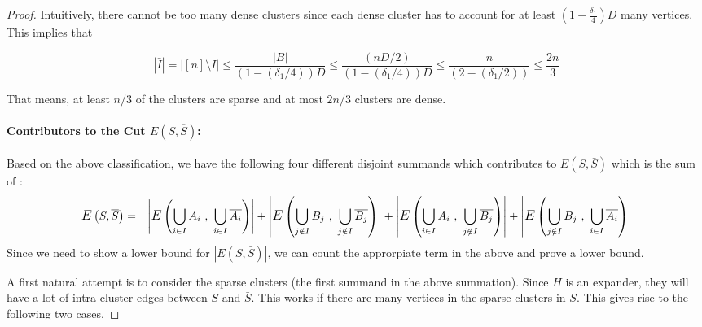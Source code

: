 \begin{proof}
Intuitively, there cannot be too many dense clusters since each dense cluster has to account for at least $\left(1-\frac{\delta_1}{4}\right)D$ many vertices. This implies that 

$$|\bar{I}| = \left|[n]\setminus I\right|\le \frac{|B|}{\left(1-(\delta_1/4)\right)D} \le \frac{(nD/2)}{\left(1-(\delta_1/4)\right)D} \le \frac{n}{\left(2-(\delta_1/2)\right)} \le \frac{2n}{3}$$

\noindent That means, at least $n/3$ of the clusters are sparse and at most $2n/3$ clusters are dense.

\paragraph{Contributors to the Cut $E(S,\overline{S})$:} Based on the above classification, we have the following four different disjoint summands which contributes to $E(S,\bar{S})$ which is the sum of :
\begin{eqnarray*}
\mathlarger{E}\left(S, \bar{S}\right) & = & 
\left| \mathlarger{E}\left(\bigcup_{i \in I} A_i~,~\bigcup_{i \in I} \bar{A_i} \right) \right| + 
\left| \mathlarger{E}\left(\bigcup_{j \notin I} B_j~,~\bigcup_{j \notin I} \bar{B_j} \right) \right|+ 
\left| \mathlarger{E}\left(\bigcup_{i \in I} A_i~,~\bigcup_{j \notin I} \bar{B_j} \right) \right| +
\left| \mathlarger{E}\left(\bigcup_{j \notin I} B_j~,~\bigcup_{i \in I} \bar{A_i} \right) \right|
\label{eqn:edge-sum-split}
\end{eqnarray*}
\noindent Since we need to show a lower bound for $|E(S,\bar{S})|$, we can count the approrpiate term in the above and prove a lower bound.

A first natural attempt is to consider the sparse clusters (the first summand in the above summation). Since $H$ is an expander, they will have a lot of intra-cluster edges between $S$ and $\bar{S}$. This works if there are many vertices in the sparse clusters in $S$. This gives rise to the following two cases.


\end{proof}
